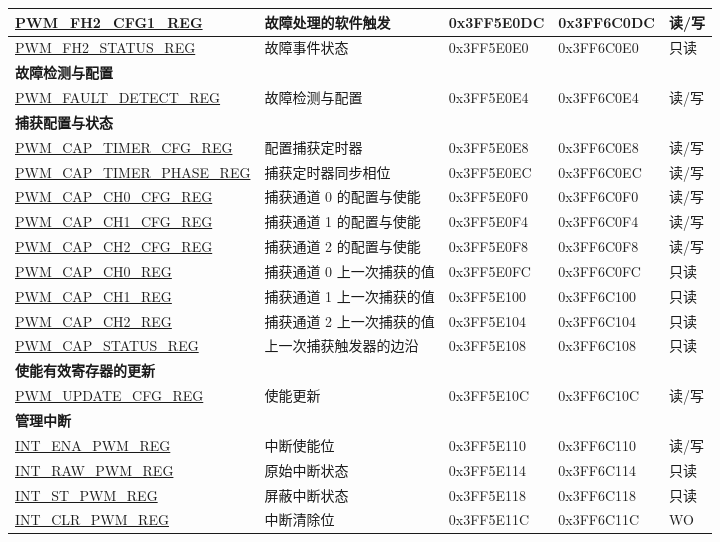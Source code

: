 \begin{longtable}{ | p{5.3cm} | p{5.2cm} | p{2cm} | p{2cm} | p{1cm} | }
\hyperref[regdesc:PWMFH2CFG1REG]{PWM\_FH2\_CFG1\_REG} & 故障处理的软件触发 & 0x3FF5E0DC & 0x3FF6C0DC & 读/写 \\ \hline
\hyperref[regdesc:PWMFH2STATUSREG]{PWM\_FH2\_STATUS\_REG} & 故障事件状态 & 0x3FF5E0E0 & 0x3FF6C0E0 & 只读 \\ \hline
\multicolumn{5}{|l|}{\textbf{故障检测与配置}} \\ \hline
\hyperref[regdesc:PWMFAULTDETECTREG]{PWM\_FAULT\_DETECT\_REG} & 故障检测与配置 & 0x3FF5E0E4 & 0x3FF6C0E4 & 读/写 \\ \hline
\multicolumn{5}{|l|}{\textbf{捕获配置与状态}} \\ \hline
\hyperref[regdesc:PWMCAPTIMERCFGREG]{PWM\_CAP\_TIMER\_CFG\_REG} & 配置捕获定时器 & 0x3FF5E0E8 & 0x3FF6C0E8 & 读/写 \\ \hline
\hyperref[regdesc:PWMCAPTIMERPHASEREG]{PWM\_CAP\_TIMER\_PHASE\_REG} & 捕获定时器同步相位 & 0x3FF5E0EC & 0x3FF6C0EC & 读/写 \\ \hline
\hyperref[regdesc:PWMCAPCH0CFGREG]{PWM\_CAP\_CH0\_CFG\_REG} & 捕获通道 0 的配置与使能 & 0x3FF5E0F0 & 0x3FF6C0F0 & 读/写 \\ \hline
\hyperref[regdesc:PWMCAPCH1CFGREG]{PWM\_CAP\_CH1\_CFG\_REG} & 捕获通道 1 的配置与使能 & 0x3FF5E0F4 & 0x3FF6C0F4 & 读/写 \\ \hline
\hyperref[regdesc:PWMCAPCH2CFGREG]{PWM\_CAP\_CH2\_CFG\_REG} & 捕获通道 2 的配置与使能 & 0x3FF5E0F8 & 0x3FF6C0F8 & 读/写 \\ \hline
\hyperref[regdesc:PWMCAPCH0REG]{PWM\_CAP\_CH0\_REG} & 捕获通道 0 上一次捕获的值 & 0x3FF5E0FC & 0x3FF6C0FC & 只读 \\ \hline
\hyperref[regdesc:PWMCAPCH1REG]{PWM\_CAP\_CH1\_REG} & 捕获通道 1 上一次捕获的值 & 0x3FF5E100 & 0x3FF6C100 & 只读 \\ \hline
\hyperref[regdesc:PWMCAPCH2REG]{PWM\_CAP\_CH2\_REG} & 捕获通道 2 上一次捕获的值 & 0x3FF5E104 & 0x3FF6C104 & 只读 \\ \hline
\hyperref[regdesc:PWMCAPSTATUSREG]{PWM\_CAP\_STATUS\_REG} & 上一次捕获触发器的边沿 & 0x3FF5E108 & 0x3FF6C108 & 只读 \\ \hline
\multicolumn{5}{|l|}{\textbf{使能有效寄存器的更新}} \\ \hline
\hyperref[regdesc:PWMUPDATECFGREG]{PWM\_UPDATE\_CFG\_REG} & 使能更新 & 0x3FF5E10C & 0x3FF6C10C & 读/写 \\ \hline
\multicolumn{5}{|l|}{\textbf{管理中断}} \\ \hline
\hyperref[regdesc:INTENAPWMREG]{INT\_ENA\_PWM\_REG} & 中断使能位 & 0x3FF5E110 & 0x3FF6C110 & 读/写 \\ \hline
\hyperref[regdesc:INTRAWPWMREG]{INT\_RAW\_PWM\_REG} & 原始中断状态 & 0x3FF5E114 & 0x3FF6C114 & 只读 \\ \hline
\hyperref[regdesc:INTSTPWMREG]{INT\_ST\_PWM\_REG} & 屏蔽中断状态 & 0x3FF5E118 & 0x3FF6C118 & 只读 \\ \hline
\hyperref[regdesc:INTCLRPWMREG]{INT\_CLR\_PWM\_REG} & 中断清除位 & 0x3FF5E11C & 0x3FF6C11C & WO \\ \hline

\end{longtable}
